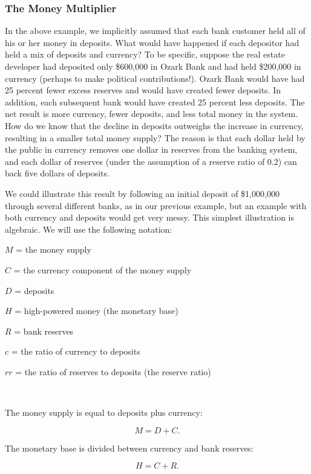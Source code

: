 \documentclass[letterpaper,12pt]{article}
\begin{document}
\subsubsection*{The Money Multiplier}

In the above example, we implicitly assumed that each bank customer
held all of his or her money in deposits. What would have happened
if each depositor had held a mix of deposits and currency? To be
specific, suppose the real estate developer had deposited only
\$600,000 in Ozark Bank and had held \$200,000 in currency (perhaps
to make political contributions!). Ozark Bank would have had 25
percent fewer excess reserves and would have created fewer deposits.
In addition, each subsequent bank would have created 25 percent less
deposits. The net result is more currency, fewer deposits, and less
total money in the system. How do we know that the decline in
deposits outweighs the increase in currency, resulting in a smaller
total money supply? The reason is that each dollar held by the
public in currency removes one dollar in reserves from the banking
system, and each dollar of reserves (under the assumption of a
reserve ratio of 0.2) can back five dollars of deposits.

We could illustrate this result by following an initial deposit of
\$1,000,000 through several different banks, as in our previous
example, but an example with both currency and deposits would get
very messy. This simplest illustration is algebraic. We will use the
following notation:

$M$ = the money supply

$C$ = the currency component of the money supply

$D$ = deposits

$H$ = high-powered money (the monetary base)

$R$ = bank reserves

$c$ = the ratio of currency to deposits

$rr$ = the ratio of reserves to deposits (the reserve ratio)

\smallskip\

The money supply is equal to deposits plus currency:

\begin{equation*}
M=D+C.
\end{equation*}

The monetary base is divided between currency and bank reserves:

\begin{equation*}
H=C+R.
\end{equation*}
\end{document}
